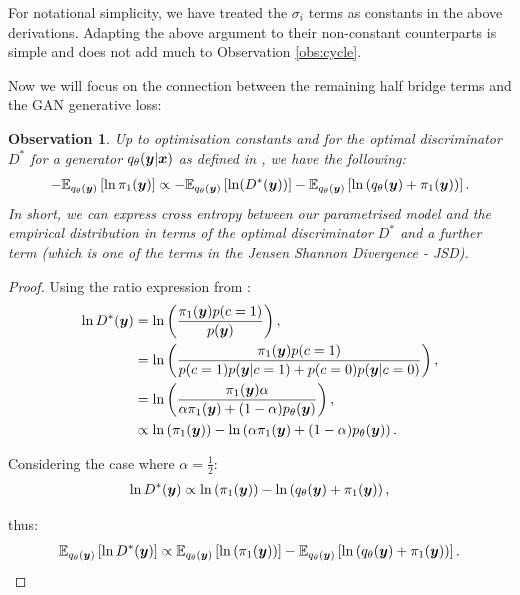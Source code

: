 \documentclass[a4paper,12pt,twoside,openright]{report}
\newtheorem{observation}{Observation}
\theoremstyle{definition}
\begin{document}
For notational simplicity, we have treated the $\sigma_i$ terms as constants in the above derivations. Adapting the above argument to their non-constant counterparts is simple and does not add much to Observation \ref{obs:cycle}.

Now we will focus on the connection between the remaining half bridge terms and the GAN generative loss:

\begin{observation}
Up to optimisation constants and for the optimal discriminator $D^{*}$ for a generator $q_{\theta}({\bm{y}} | {\bm{x}})$ as defined in \citep{goodfellow2014generative,mohamed2016learning}, we have the following:
\begin{align*}
-\mathbb{E}_{q_{\theta}({\bm{y}})}\left[ \operatorname{ln}  \pi_1({\bm{y}}) \right] \propto-\mathbb{E}_{q_{\theta}({\bm{y}})}\left[\operatorname{ln}(D^{*}({\bm{y}}))\right] - \mathbb{E}_{q_{\theta}({\bm{y}})}\left[\operatorname{ln}\left(q_{\theta}({\bm{y}}) + \pi_1({\bm{y}})\right)\right].
\end{align*}
In short, we can express cross entropy between our parametrised model and the empirical distribution in terms of the optimal discriminator $D^{*}$ and a further term (which is one of the terms in the Jensen Shannon Divergence - JSD). 
\end{observation}
\begin{proof}

Using the ratio expression from \cite{mohamed2016learning}:
\begin{align*}
\operatorname{ln} D^{*}({\bm{y}}) &= \operatorname{ln}\left(\frac{\pi_1({\bm{y}})p(c=1)}{p({\bm{y}})}\right), \\
&=\operatorname{ln}\left(\frac{\pi_1({\bm{y}})p(c=1)}{p(c=1)p({\bm{y}}|c=1) + p(c=0)p({\bm{y}}|c=0)}\right), \\
&= \operatorname{ln}\left(\frac{\pi_1({\bm{y}})\alpha}{\alpha\pi_1({\bm{y}}) + (1-\alpha)  p_{\theta}({\bm{y}})}\right), \\
&\propto \operatorname{ln}\left(\pi_1({\bm{y}})\right) - \operatorname{ln}\left(\alpha\pi_1({\bm{y}})  + (1-\alpha)p_{\theta}({\bm{y}}) \right).
\end{align*}

Considering the case where $\alpha=\frac{1}{2}$: 
\begin{align*}
\operatorname{ln} D^{*}({\bm{y}}) \propto \operatorname{ln}\left(\pi_1({\bm{y}})\right) - \operatorname{ln}\left(q_{\theta}({\bm{y}}) + \pi_1({\bm{y}})\right),
\end{align*}

thus:
\begin{align}\label{eq:gan_entropy}
\mathbb{E}_{q_{\theta}({\bm{y}})}\left[\operatorname{ln} D^{*}({\bm{y}})\right] \propto \mathbb{E}_{q_{\theta}({\bm{y}})}\left[\operatorname{ln}\left(\pi_1({\bm{y}})\right)\right] -\mathbb{E}_{q_{\theta}({\bm{y}})}\left[\operatorname{ln}\left(q_{\theta}({\bm{y}}) + \pi_1({\bm{y}})\right)\right].
\end{align}

\end{proof}
\end{document}
